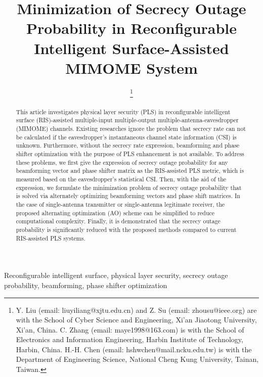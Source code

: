 \documentclass[journal]{IEEEtran}
\theoremstyle{definition}
\begin{document}
\title{Minimization of Secrecy Outage Probability in Reconfigurable Intelligent Surface-Assisted MIMOME System}

\author{ 

\thanks{Y. Liu (email: {liuyiliang@xjtu.edu.cn}) and Z. Su (email: {zhousu@ieee.org}) are with the School of Cyber Science and Engineering, Xi'an Jiaotong University, Xi'an, China. C. Zhang (email: {maye1998@163.com}) is with the School of Electronics and Information Engineering, Harbin Institute of Technology, Harbin, China. H.-H. Chen (email: {hshwchen@mail.ncku.edu.tw}) is with the Department of Engineering Science, National Cheng Kung University, Tainan, Taiwan. 
}

}

\maketitle

\begin{abstract}
This article investigates physical layer security (PLS) in reconfigurable intelligent surface (RIS)-assisted multiple-input multiple-output multiple-antenna-eavesdropper (MIMOME) channels. Existing researches ignore the problem that secrecy rate can not be calculated if the eavesdropper's instantaneous channel state information (CSI) is unknown. Furthermore, without the secrecy rate expression, beamforming and phase shifter optimization with the purpose of PLS enhancement is not available. To address these problems, we first give the expression of secrecy outage probability for any beamforming vector and phase shifter matrix as the RIS-assisted PLS metric, which is measured based on the eavesdropper's statistical CSI. Then, with the aid of the expression, we formulate the minimization problem of secrecy outage probability that is solved via alternately optimizing beamforming vectors and phase shift matrices. In the case of single-antenna transmitter or single-antenna legitimate receiver, the proposed alternating optimization (AO) scheme can be simplified to reduce computational complexity. Finally, it is demonstrated that the secrecy outage probability is significantly reduced with the proposed methods compared to current RIS-assisted PLS systems.
\end{abstract}

\begin{IEEEkeywords}
Reconfigurable intelligent surface, physical layer security, secrecy outage probability, beamforming, phase shifter optimization
\end{IEEEkeywords}
\end{document}
